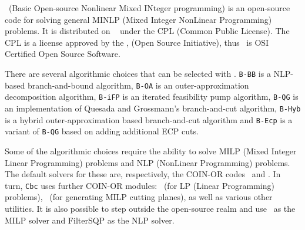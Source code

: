 

\Bonmin\ (Basic Open-source Nonlinear Mixed INteger programming)
is an open-source code for solving general MINLP (Mixed
Integer NonLinear Programming) problems.
 It is distributed on
\COINOR\ 
under the CPL (Common Public
License). The CPL is a license approved by the
,
(Open Source Initiative),
 thus \Bonmin\ is OSI
Certified Open Source Software.

There are several algorithmic choices that can be selected with \Bonmin.
{\tt B-BB} is a NLP-based branch-and-bound algorithm,
{\tt B-OA} is an
outer-ap\-prox\-i\-ma\-tion decomposition algorithm, {\tt B-iFP} is an iterated
feasibility pump algorithm, {\tt B-QG} is an
implementation of  Quesada and Grossmann's branch-and-cut algorithm,
{\tt B-Hyb} is a hybrid outer-ap\-prox\-i\-ma\-tion based
branch-and-cut algorithm and {\tt B-Ecp} is a variant of {\tt B-QG} based
on adding additional ECP cuts.


Some of the algorithmic choices require the ability to solve MILP
(Mixed Integer Linear Programming) problems and NLP (NonLinear
Programming) problems. The default solvers for these are,
respectively, the COIN-OR codes \Cbc\ and \Ipopt. In turn,
{\tt Cbc} uses further COIN-OR modules: \Clp\ (for LP (Linear
Programming) problems), \Cgl\ (for generating MILP cutting
planes), as well as various other utilities. It is also possible to
step outside the open-source realm and use
\Cplex\ as the MILP solver and FilterSQP as the NLP solver. 

